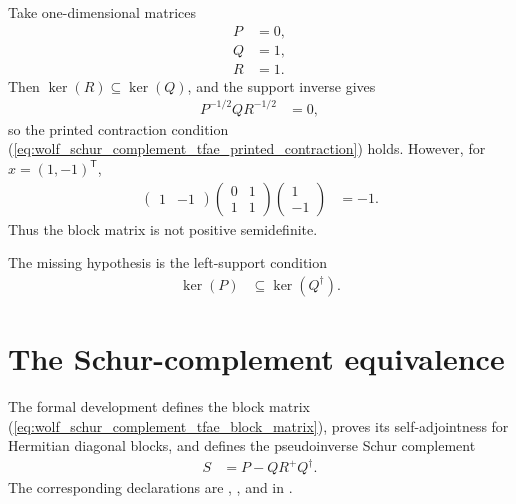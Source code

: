 \documentclass{article}
\begin{document}
Take one-dimensional matrices
\begin{align}
    P&=0,
    \label{eq:wolf_schur_complement_tfae_counterexample_p}\\
    Q&=1,
    \label{eq:wolf_schur_complement_tfae_counterexample_q}\\
    R&=1.
    \label{eq:wolf_schur_complement_tfae_counterexample_r}
\end{align}
Then $\ker(R)\subseteq\ker(Q)$, and the support inverse gives
\begin{align}
    P^{-1/2}QR^{-1/2}
        &=0,
    \label{eq:wolf_schur_complement_tfae_counterexample_contraction}
\end{align}
so the printed contraction condition
(\ref{eq:wolf_schur_complement_tfae_printed_contraction}) holds. However, for
$x=(1,-1)^{\mathsf T}$,
\begin{align}
    \begin{pmatrix}1&-1\end{pmatrix}
    \begin{pmatrix}0&1\\1&1\end{pmatrix}
    \begin{pmatrix}1\\-1\end{pmatrix}
        &=-1.
    \label{eq:wolf_schur_complement_tfae_counterexample_quadratic_form}
\end{align}
Thus the block matrix is not positive semidefinite.

The missing hypothesis is the left-support condition
\begin{align}
    \ker(P)&\subseteq\ker(Q^\dagger).
    \label{eq:wolf_schur_complement_tfae_left_support}
\end{align}

\section{The Schur-complement equivalence}

The formal development defines the block matrix
(\ref{eq:wolf_schur_complement_tfae_block_matrix}), proves its
self-adjointness for Hermitian diagonal blocks, and defines the pseudoinverse
Schur complement
\begin{align}
    S&=P-QR^+Q^\dagger.
    \label{eq:wolf_schur_complement_tfae_schur_complement}
\end{align}
The corresponding declarations are
,
, and
 in
.
\end{document}
